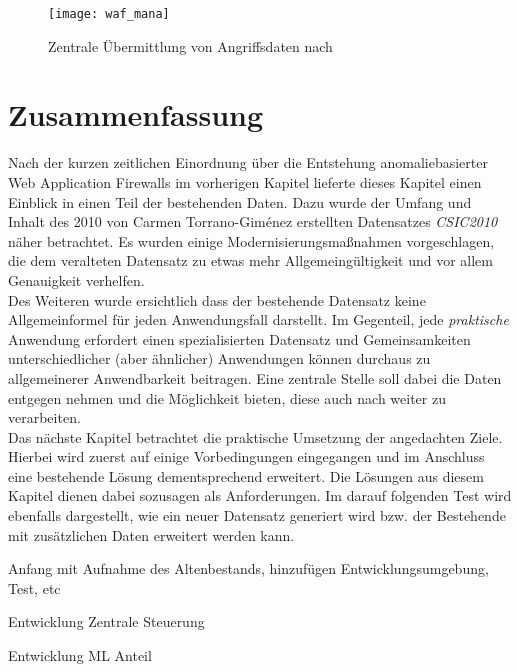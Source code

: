 \begin{figure}[ht]
  \begin{center}
    \texttt{[image: waf\_mana]}
    \caption{Zentrale Übermittlung von Angriffsdaten nach~\cite{Manaseer2018}}
    \label{fig.wafmana}
  \end{center}
\end{figure}



\section{Zusammenfassung}

Nach der kurzen zeitlichen Einordnung über die Entstehung anomaliebasierter Web Application Firewalls im vorherigen Kapitel lieferte dieses Kapitel einen Einblick in einen Teil der bestehenden Daten. Dazu wurde der Umfang und Inhalt des 2010 von Carmen Torrano-Giménez erstellten Datensatzes \emph{CSIC2010} näher betrachtet. Es wurden einige Modernisierungsmaßnahmen vorgeschlagen, die dem veralteten Datensatz zu etwas mehr Allgemeingültigkeit und vor allem Genauigkeit verhelfen.\\ Des Weiteren wurde ersichtlich dass der bestehende Datensatz keine Allgemeinformel für jeden Anwendungsfall darstellt. Im Gegenteil, jede \emph{praktische} Anwendung erfordert einen spezialisierten Datensatz und Gemeinsamkeiten unterschiedlicher (aber ähnlicher) Anwendungen können durchaus zu allgemeinerer Anwendbarkeit beitragen. Eine zentrale Stelle soll dabei die Daten entgegen nehmen und die Möglichkeit bieten, diese auch nach weiter zu verarbeiten. \\

Das nächste Kapitel betrachtet die praktische Umsetzung der angedachten Ziele. Hierbei wird zuerst auf einige Vorbedingungen eingegangen und im Anschluss eine bestehende Lösung dementsprechend erweitert. Die Lösungen aus diesem Kapitel dienen dabei sozusagen als Anforderungen. Im darauf folgenden Test wird ebenfalls dargestellt, wie ein neuer Datensatz generiert wird bzw. der Bestehende mit zusätzlichen Daten erweitert werden kann.

\begin{neu}
  Anfang mit Aufnahme des Altenbestands, hinzufügen Entwicklungsumgebung, Test, etc

  Entwicklung Zentrale Steuerung

  Entwicklung ML Anteil
\end{neu}